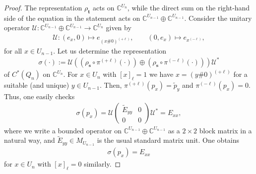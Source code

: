 \documentclass[10pt,a4paper]{amsart}
\newcommand{\C}{\mathbb{C}}
\begin{document}
\begin{proof}
    The representation $\rho_\mathbf{t}$ acts on $\C^{U_n}$, while the direct sum on the right-hand side of the equation in the statement acts on $\C^{U_{n-1}} \oplus \C^{U_{n-1}}$. Consider the unitary operator $\mathcal{U}: \C^{U_{n-1}} \oplus \C^{U_{n-1}} \to \C^{U_n}$ given by
    \begin{align*}
        \mathcal{U}: (e_x, 0) \mapsto e_{(x \# 0)^{(+\ell)}}, \qquad
        (0, e_x) \mapsto e_{x^{(-\ell)}},
    \end{align*}
    for all $x \in U_{n-1}$. 
    Let us determine the representation
    \begin{align*}
        \sigma(\cdot) := \mathcal{U} \left(\left(\rho_\mathbf{s} \circ \pi^{(+\ell)}(\cdot)\right) \oplus \left(\rho_\mathbf{s} \circ \pi^{(-\ell)}(\cdot)\right) \right) \mathcal{U}^\ast
    \end{align*}
    of $C^\ast(Q_n)$ on $\C^{U_n}$. For $x \in U_n$ with $[x]_\ell = 1$ we have $x=(y \# 0)^{(+\ell)}$ for a suitable (and unique) $y \in U_{n-1}$. Then, $\pi^{(+\ell)}(p_x) = \tilde{p}_y$ and $\pi^{(-\ell)}(p_x) = 0$. Thus, one easily checks
    \begin{align*}
        \sigma(p_x) = \mathcal{U} \begin{pmatrix}
            \tilde{E}_{yy} & 0 \\
            0      & 0
        \end{pmatrix} \mathcal{U}^\ast = E_{xx},
    \end{align*}
    where we write a bounded operator on $\C^{U_{n-1}} \oplus \C^{U_{n-1}}$ as a $2 \times 2$ block matrix in a natural way, and $\tilde{E}_{yy} \in M_{U_{n-1}}$ is the usual standard matrix unit. One obtains 
    \begin{align*}
        \sigma(p_x) = E_{xx}
    \end{align*}
    for $x \in U_n$ with $[x]_\ell = 0$ similarly.


\end{proof}
\end{document}
